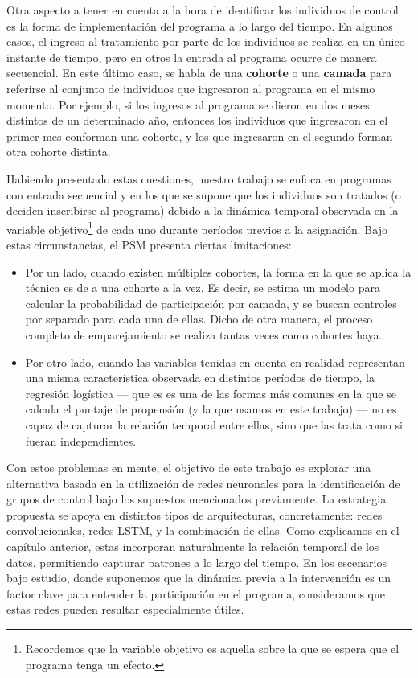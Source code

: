 \documentclass[../main.tex]{subfiles}
\begin{document}
Otra aspecto a tener en cuenta a la hora de identificar los individuos de control es la
forma de implementación del programa a lo largo del tiempo. En algunos casos, el ingreso
al tratamiento por parte de los individuos se realiza en un único instante de tiempo, pero
en otros la entrada al programa ocurre de manera secuencial. En este último caso, se habla
de una \textbf{cohorte} o una \textbf{camada} para referirse al conjunto de individuos que
ingresaron al programa en el mismo momento. Por ejemplo, si los ingresos al programa se
dieron en dos meses distintos de un determinado año, entonces los individuos que
ingresaron en el primer mes conforman una cohorte, y los que ingresaron en el segundo forman
otra cohorte distinta.

Habiendo presentado estas cuestiones, nuestro trabajo se enfoca en programas con entrada
secuencial y en los que se supone que los individuos son tratados (o deciden inscribirse
al programa) debido a la dinámica temporal observada en la variable
objetivo\footnote{Recordemos que la variable objetivo es aquella sobre la que se espera
que el programa tenga un efecto.} de cada uno durante períodos previos a la asignación.
Bajo estas circunstancias, el PSM presenta ciertas limitaciones:
\begin{itemize}
    \item Por un lado, cuando existen múltiples cohortes, la forma en la que se aplica la
    técnica es de a una cohorte a la vez. Es decir, se estima un modelo para calcular la
    probabilidad de participación por camada, y se buscan controles por separado para cada
    una de ellas. Dicho de otra manera, el proceso completo de emparejamiento se realiza
    tantas veces como cohortes haya.
    \item Por otro lado, cuando las variables tenidas en cuenta en realidad representan
    una misma característica observada en distintos períodos de tiempo, la regresión
    logística — que es es una de las formas más comunes en la que se calcula el puntaje de
    propensión (y la que usamos en este trabajo) — no es capaz de capturar la relación
    temporal entre ellas, sino que las trata como si fueran independientes.
\end{itemize}

Con estos problemas en mente, el objetivo de este trabajo es explorar una alternativa
basada en la utilización de redes neuronales para la identificación de grupos de control
bajo los supuestos mencionados previamente. La estrategia propuesta se apoya en distintos
tipos de arquitecturas, concretamente: redes convolucionales, redes LSTM, y la combinación
de ellas. Como explicamos en el capítulo anterior, estas incorporan naturalmente la
relación temporal de los datos, permitiendo capturar patrones a lo largo del tiempo. En
los escenarios bajo estudio, donde suponemos que la dinámica previa a la intervención es
un factor clave para entender la participación en el programa, consideramos que estas
redes pueden resultar especialmente útiles.
\end{document}
